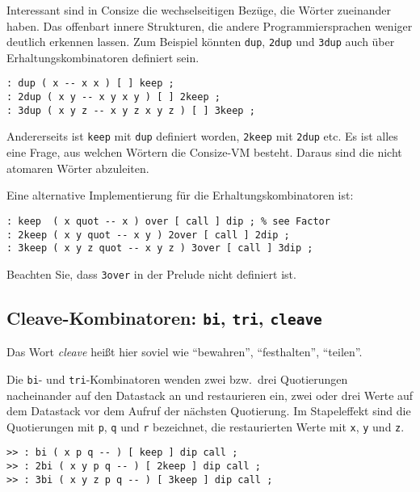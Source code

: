 Interessant sind in Consize die wechselseitigen Bezüge, die Wörter zueinander haben. Das offenbart innere Strukturen, die andere Programmiersprachen weniger deutlich erkennen lassen. Zum Beispiel könnten \verb|dup|, \verb|2dup| und \verb|3dup| auch über Erhaltungskombinatoren definiert sein. 

\begin{verbatim}
: dup ( x -- x x ) [ ] keep ;
: 2dup ( x y -- x y x y ) [ ] 2keep ;
: 3dup ( x y z -- x y z x y z ) [ ] 3keep ;
\end{verbatim}

Andererseits ist \verb|keep| mit \verb|dup| definiert worden, \verb|2keep| mit \verb|2dup| etc. Es ist alles eine Frage, aus welchen Wörtern die Consize-VM besteht. Daraus sind die nicht atomaren Wörter abzuleiten.

Eine alternative Implementierung für die Erhaltungskombinatoren ist:

\begin{verbatim}
: keep  ( x quot -- x ) over [ call ] dip ; % see Factor
: 2keep ( x y quot -- x y ) 2over [ call ] 2dip ;
: 3keep ( x y z quot -- x y z ) 3over [ call ] 3dip ;
\end{verbatim}

Beachten Sie, dass \verb|3over| in der Prelude nicht definiert ist.

\subsection{Cleave-Kombinatoren: \texttt{bi}, \texttt{tri}, \texttt{cleave}}

Das Wort \emph{cleave} heißt hier soviel wie "`bewahren"', "`festhalten"', "`teilen"'.

Die \verb|bi|- und \verb|tri|-Kombinatoren wenden zwei bzw.\ drei Quotierungen nacheinander auf den Datastack an und restaurieren ein, zwei oder drei Werte auf dem Datastack vor dem Aufruf der nächsten Quotierung. Im Stapeleffekt sind die Quotierungen mit \verb|p|, \verb|q| und \verb|r| bezeichnet, die restaurierten Werte mit \verb|x|, \verb|y| und \verb|z|.

\begin{verbatim}
>> : bi ( x p q -- ) [ keep ] dip call ;
>> : 2bi ( x y p q -- ) [ 2keep ] dip call ;
>> : 3bi ( x y z p q -- ) [ 3keep ] dip call ;
\end{verbatim}

